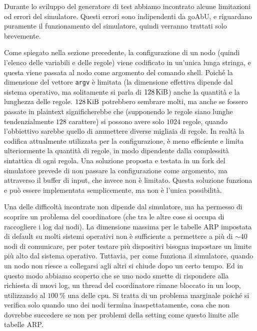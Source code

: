 \documentclass[12pt, a4paper]{article}
\begin{document}
Durante lo sviluppo del generatore di test abbiamo incontrato alcune limitazioni od errori del simulatore. Questi errori sono indipendenti da goAbU, e riguardano puramente il funzionamento del simulatore, quindi verranno trattati solo brevemente.

Come spiegato nella sezione precedente, la configurazione di un nodo (quindi l'elenco delle variabili e delle regole) viene codificato in un'unica lunga stringa, e questa viene passata al nodo come argomento del comando shell. Poiché la dimensione del vettore \lstinline{argv} è limitata (la dimensione effettiva dipende dal sistema operativo, ma solitamente si parla di $\qty{128}{\kibi\byte}$) anche la quantità e la lunghezza delle regole. $\qty{128}{\kibi\byte}$ potrebbero sembrare molti, ma anche se fossero passate in plaintext significherebbe che (supponendo le regole siano lunghe tendenzialmente $128$ carattere) si possono avere solo $1024$ regole, quando l'obbiettivo sarebbe quello di ammettere diverse migliaia di regole. In realtà la codifica attualmente utilizzata per la configurazione, è meno efficiente e limita ulteriormente la quantità di regole, in modo dipendente dalla complessità sintattica di ogni regola.
Una soluzione proposta e testata in un fork del simulatore prevede di non passare la configurazione come argomento, ma attraverso il buffer di input, che invece non è limitato. Questa soluzione funziona e può essere implementata semplicemente, ma non è l'unica possibilità.

Una delle difficoltà incontrate non dipende dal simulatore, ma ha permesso di scoprire un problema del coordinatore (che tra le altre cose si occupa di raccogliere i log dai nodi).
La dimensione massima per le tabelle ARP impostata di default su molti sistemi operativi non è sufficiente a permettere a più di $\sim40$ nodi di comunicare, per poter testare più dispositivi bisogna impostare un limite più alto dal sistema operativo. Tuttavia, per come funziona il simulatore, quando un nodo non riesce a collegarsi agli altri si chiude dopo un certo tempo.
Ed in questo modo abbiamo scoperto che se uno nodo smette di rispondere alla richiesta di nuovi log, un thread del coordinatore rimane bloccato in un loop, utilizzando al $\qty{100}{\percent}$ una delle cpu.
Si tratta di un problema marginale poiché si verifica solo quando uno dei nodi termina inaspettatamente, cosa che non dovrebbe succedere se non per problemi della setting come questo limite alle tabelle ARP.
\end{document}
